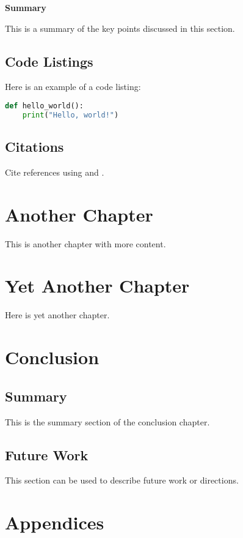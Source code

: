 \documentclass[12pt, oneside]{book}
\newenvironment{summary}[1][Summary]
  {\begin{mdframed}[backgroundcolor=gray!10]\textbf{#1}\par\medskip}
  {\medskip\end{mdframed}}
\begin{document}
\begin{summary}
This is a summary of the key points discussed in this section.
\end{summary}

\section{Code Listings}
Here is an example of a code listing:
\begin{lstlisting}[language=Python, caption=Sample Python Code]
def hello_world():
    print("Hello, world!")
\end{lstlisting}

\section{Citations}
Cite references using \textcite{exampleBook} and \autocite{exampleBook}.

\chapter{Another Chapter}
This is another chapter with more content.

\chapter{Yet Another Chapter}
Here is yet another chapter.

\chapter{Conclusion}
\section{Summary}
This is the summary section of the conclusion chapter.

\section{Future Work}
This section can be used to describe future work or directions.

\clearpage
\chapter*{Appendices}
\end{document}
